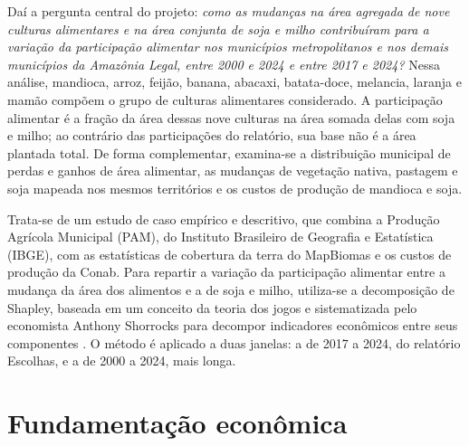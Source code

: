 \documentclass[11pt,a4paper]{article}
\begin{document}
Daí a pergunta central do projeto: \textit{como as mudanças na área agregada de nove culturas alimentares e na área conjunta de soja e milho contribuíram para a variação da participação alimentar nos municípios metropolitanos e nos demais municípios da Amazônia Legal, entre 2000 e 2024 e entre 2017 e 2024?} Nessa análise, mandioca, arroz, feijão, banana, abacaxi, batata-doce, melancia, laranja e mamão compõem o grupo de culturas alimentares considerado. A participação alimentar é a fração da área dessas nove culturas na área somada delas com soja e milho; ao contrário das participações do relatório, sua base não é a área plantada total. De forma complementar, examina-se a distribuição municipal de perdas e ganhos de área alimentar, as mudanças de vegetação nativa, pastagem e soja mapeada nos mesmos territórios e os custos de produção de mandioca e soja.

Trata-se de um estudo de caso empírico e descritivo, que combina a Produção Agrícola Municipal (PAM), do Instituto Brasileiro de Geografia e Estatística (IBGE), com as estatísticas de cobertura da terra do MapBiomas e os custos de produção da Conab. Para repartir a variação da participação alimentar entre a mudança da área dos alimentos e a de soja e milho, utiliza-se a decomposição de Shapley, baseada em um conceito da teoria dos jogos e sistematizada pelo economista Anthony Shorrocks para decompor indicadores econômicos entre seus componentes \citep{shorrocks2013}. O método é aplicado a duas janelas: a de 2017 a 2024, do relatório Escolhas, e a de 2000 a 2024, mais longa.

\section{Fundamentação econômica}\label{sec:fundamentacao}
\end{document}
